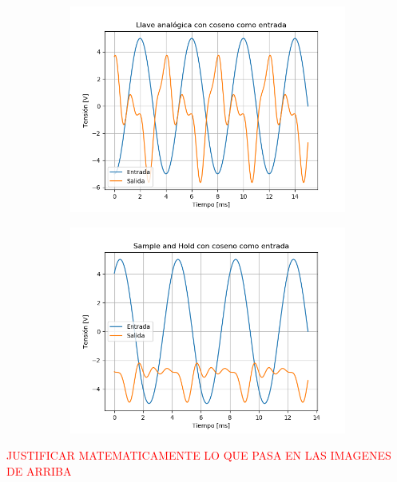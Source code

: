 \begin{figure}[H]
	\begin{subfigure}{.5\textwidth}
	\centering
	\includegraphics[width=\textwidth]{ImagenesEjercicio6/puntoc-d/LA - Cos.png}
	\end{subfigure}
	\begin{subfigure}{.5\textwidth}
	\centering
	\includegraphics[width=\textwidth]{ImagenesEjercicio6/puntoc-d/SH - Cos.png}
	\end{subfigure}
\end{figure}

{\huge \textcolor{red}{JUSTIFICAR MATEMATICAMENTE LO QUE PASA EN LAS IMAGENES DE ARRIBA}}


